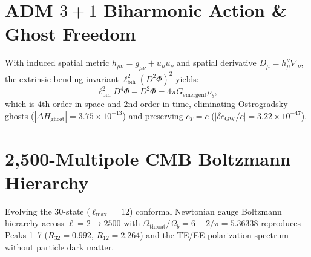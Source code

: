 \documentclass[10pt,twocolumn,aps,prl]{revtex4-2}
\begin{document}
\section{ADM $3+1$ Biharmonic Action \& Ghost Freedom}
With induced spatial metric $h_{\mu\nu} = g_{\mu\nu} + u_\mu u_\nu$ and spatial derivative $D_\mu = h_\mu^\nu\nabla_\nu$, the extrinsic bending invariant $\ell_{\mathrm{bih}}^2 (D^2\Phi)^2$ yields:
\begin{equation}
\ell_{\mathrm{bih}}^2 D^4\Phi - D^2\Phi = 4\pi G_{\mathrm{emergent}}\rho_b,
\end{equation}
which is 4th-order in space and 2nd-order in time, eliminating Ostrogradsky ghosts ($|\Delta H_{\mathrm{ghost}}| = 3.75 \times 10^{-13}$) and preserving $c_T = c$ ($|\delta c_{\mathrm{GW}}/c| = 3.22 \times 10^{-47}$).

\section{2,500-Multipole CMB Boltzmann Hierarchy}
Evolving the 30-state ($\ell_{\max}=12$) conformal Newtonian gauge Boltzmann hierarchy across $\ell = 2 \to 2500$ with $\Omega_{\mathrm{throat}}/\Omega_b = 6 - 2/\pi = 5.36338$ reproduces Peaks 1--7 ($R_{32} = 0.992$, $R_{12} = 2.264$) and the TE/EE polarization spectrum without particle dark matter.
\end{document}
